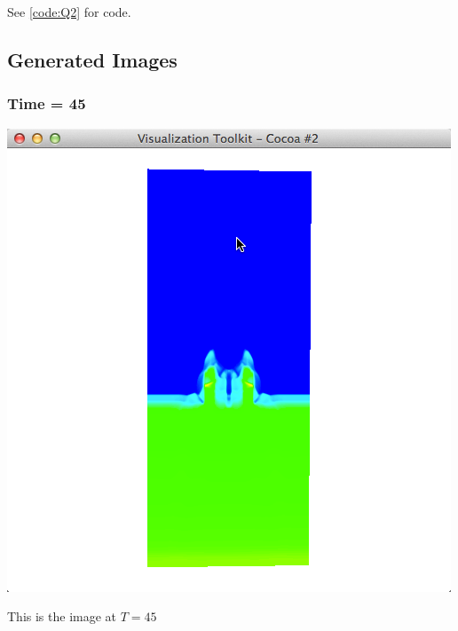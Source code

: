 \documentclass[11pt]{scrartcl}
\begin{document}
See \ref{code:Q2} for code.
\subsection{Generated Images}
\subsubsection{Time = 45}
\begin{minipage}[t]{\linewidth}
{
\includegraphics[scale = 0.5]{img_2_45.png}

\centering
\medskip
{\footnotesize This is the image at $T = 45$}
}
\end{minipage}
\end{document}
